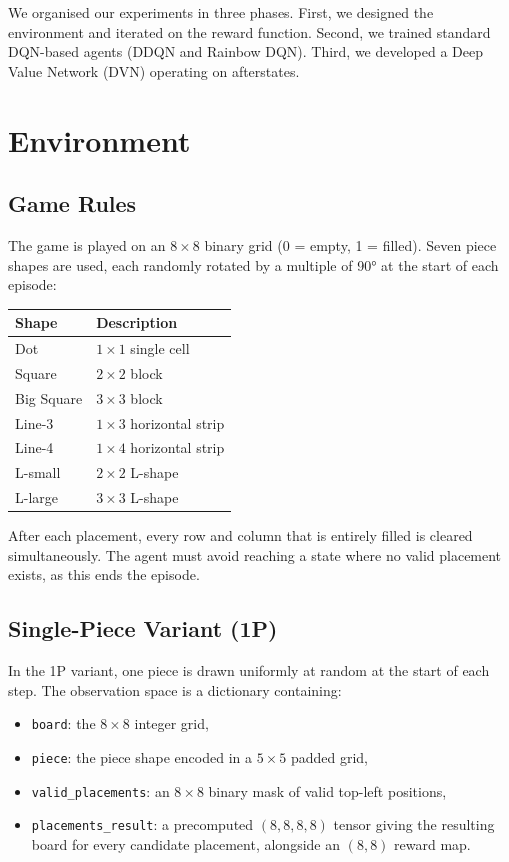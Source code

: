 \documentclass[10pt]{article}
\begin{document}
We organised our experiments in three phases. First, we designed the environment and iterated on the reward function. Second, we trained standard DQN-based agents (DDQN and Rainbow DQN). Third, we developed a Deep Value Network (DVN) operating on afterstates.

\section{Environment}

\subsection{Game Rules}

The game is played on an $8\times8$ binary grid (0 = empty, 1 = filled). Seven piece shapes are used, each randomly rotated by a multiple of 90° at the start of each episode:

\begin{center}
\begin{tabular}{ll}
\toprule
Shape & Description \\
\midrule
Dot        & $1\times1$ single cell \\
Square     & $2\times2$ block \\
Big Square & $3\times3$ block \\
Line-3     & $1\times3$ horizontal strip \\
Line-4     & $1\times4$ horizontal strip \\
L-small    & $2\times2$ L-shape \\
L-large    & $3\times3$ L-shape \\
\bottomrule
\end{tabular}
\end{center}

After each placement, every row and column that is entirely filled is cleared simultaneously. The agent must avoid reaching a state where no valid placement exists, as this ends the episode.

\subsection{Single-Piece Variant (1P)}

In the 1P variant, one piece is drawn uniformly at random at the start of each step. The observation space is a dictionary containing:
\begin{itemize}
    \item \texttt{board}: the $8\times8$ integer grid,
    \item \texttt{piece}: the piece shape encoded in a $5\times5$ padded grid,
    \item \texttt{valid\_placements}: an $8\times8$ binary mask of valid top-left positions,
    \item \texttt{placements\_result}: a precomputed $(8,8,8,8)$ tensor giving the resulting board for every candidate placement, alongside an $(8,8)$ reward map.
\end{itemize}
\end{document}
